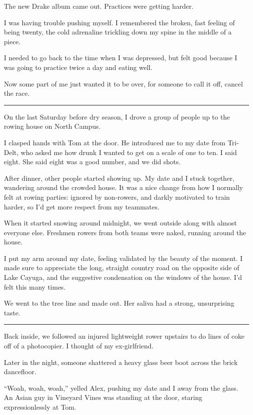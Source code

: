 The new Drake album came out. Practices were getting harder.

I was having trouble pushing myself.  I remembered the broken, fast feeling of
being twenty, the cold adrenaline trickling down my spine in the middle of a
piece.

I needed to go back to the time when I was depressed, but felt good because I
was going to practice twice a day and eating well.

Now some part of me just wanted it to be over, for someone to call it off,
cancel the race.

\plainfancybreak{12pt}{2}{}

On the last Saturday before dry season, I drove a group of people up to the
rowing house on North Campus.

I clasped hands with Tom at the door.  He introduced me to my date from
Tri-Delt, who asked me how drunk I wanted to get on a scale of one to ten. I
said eight.  She said eight was a good number, and we did shots.

After dinner, other people started showing up.  My date and I stuck together,
wandering around the crowded house.  It was a nice change from how I normally
felt at rowing parties: ignored by non-rowers, and darkly motivated to train
harder, so I'd get more respect from my teammates.

When it started snowing around midnight, we went outside along with almost
everyone else.  Freshmen rowers from both teams were naked, running around the
house.

I put my arm around my date, feeling validated by the beauty of the moment.  I
made sure to appreciate the long, straight country road on the opposite side of
Lake Cayuga, and the suggestive condensation on the windows of the house.  I'd
felt this many times.

We went to the tree line and made out.  Her saliva had a strong, unsurprising
taste.

\plainfancybreak{12pt}{2}{}

Back inside, we followed an injured lightweight rower upstairs to do lines of
coke off of a photocopier.  I thought of my ex-girlfriend.

Later in the night, someone shattered a heavy glass beer boot across the brick
dancefloor.

``Woah, woah, woah,'' yelled Alex, pushing my date and I away from the glass.
An Asian guy in Vineyard Vines was standing at the door, staring
expressionlessly at Tom.

